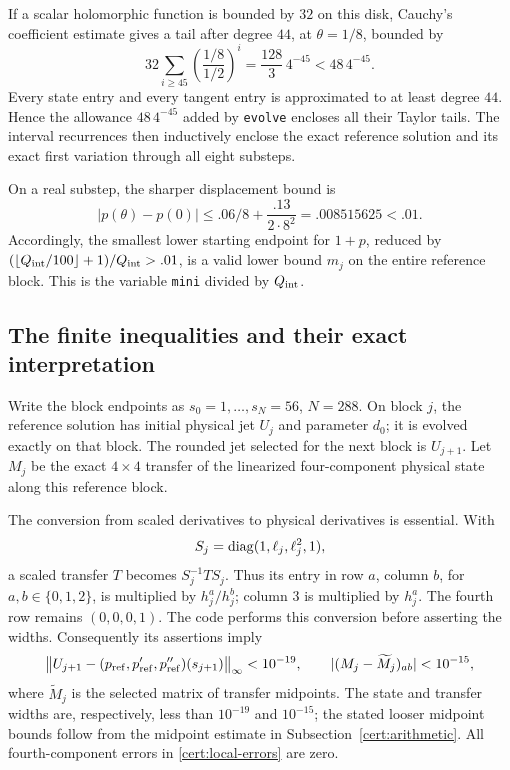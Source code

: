 If a scalar holomorphic function is bounded by \(32\) on this disk,
Cauchy's coefficient estimate gives a tail after degree \(44\), at
\(\theta=1/8\), bounded by
\begin{equation}\label{cert:step-tail}
 32\sum_{i\ge45}\left(\frac{1/8}{1/2}\right)^i
 =\frac{128}{3}\,4^{-45}<48\,4^{-45}.
\end{equation}
Every state entry and every tangent entry is approximated to at least
degree \(44\).  Hence the allowance \(48\,4^{-45}\) added by
\texttt{evolve} encloses all their Taylor tails.  The interval recurrences
then inductively enclose the exact reference solution and its exact
first variation through all eight substeps.

On a real substep, the sharper displacement bound is
\begin{equation}\label{cert:real-step-displacement}
 |p(\theta)-p(0)|
 \le .06/8+\frac{.13}{2\cdot8^2}
 =.008515625<.01.
\end{equation}
Accordingly, the smallest lower starting endpoint for \(1+p\), reduced
by \((\lfloor Q_{\rm int}/100\rfloor+1)/Q_{\rm int}>.01\), is a valid
lower bound \(m_j\) on the entire reference block.  This is the variable
\texttt{mini} divided by \(Q_{\rm int}\).

\subsection{The finite inequalities and their exact interpretation}
\label{cert:ledger}

Write the block endpoints as \(s_0=1,\ldots,s_N=56\), \(N=288\).
On block \(j\), the reference solution has initial physical jet \(U_j\)
and parameter \(d_0\); it is evolved exactly on that block.
The rounded jet selected for the next block is \(U_{j+1}\).
Let \(M_j\) be the exact \(4\times4\) transfer of the linearized
four-component physical state along this reference block.

The conversion from scaled derivatives to physical derivatives is essential.
With
\[
 S_j=\operatorname{diag}(1,\ell_j,\ell_j^2,1),
\]
a scaled transfer \(T\) becomes \(S_j^{-1}TS_j\).
Thus its entry in row \(a\), column \(b\), for \(a,b\in\{0,1,2\}\),
is multiplied by \(h_j^a/h_j^b\); column \(3\) is multiplied by \(h_j^a\).
The fourth row remains \((0,0,0,1)\).
The code performs this conversion before asserting the widths.
Consequently its assertions imply
\begin{equation}\label{cert:local-errors}
 \big\|U_{j+1}- (p_{\rm ref},p'_{\rm ref},p''_{\rm ref})
                         (s_{j+1})\big\|_\infty<10^{-19},
 \qquad
 |(M_j-\widetilde M_j)_{ab}|<10^{-15},
\end{equation}
where \(\widetilde M_j\) is the selected matrix of transfer midpoints.
The state and transfer widths are, respectively, less than
\(10^{-19}\) and \(10^{-15}\); the stated looser midpoint bounds follow
from the midpoint estimate in Subsection~\ref{cert:arithmetic}.
All fourth-component errors in \eqref{cert:local-errors} are zero.


